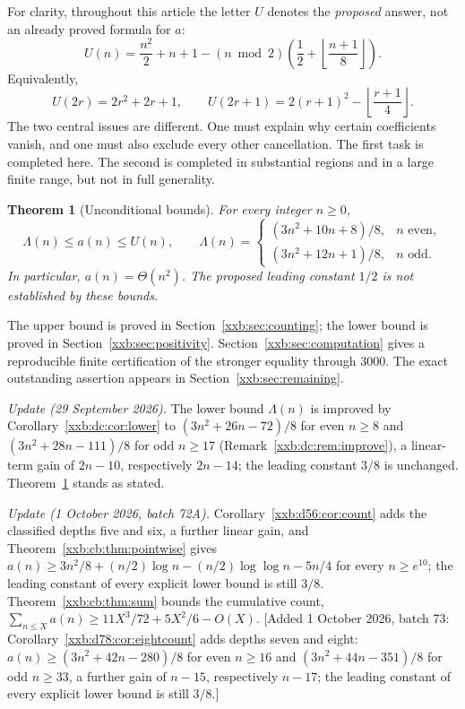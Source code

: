 \documentclass[11pt,a4paper]{article}
\numberwithin{equation}{section}
\newtheorem{theorem}{Theorem}[section]
\theoremstyle{definition}
\theoremstyle{remark}
\theoremstyle{plain}
\newcommand{\U}{U}
\begin{document}
For clarity, throughout this article the letter $\U$ denotes the
\emph{proposed} answer, not an already proved formula for $a$:
\begin{equation}\label{xxb:eq:U}
 \U(n)=\frac{n^2}{2}+n+1
 -(n\bmod2)\left(\frac12+\left\lfloor\frac{n+1}{8}\right\rfloor\right).
\end{equation}
Equivalently,
\begin{equation}\label{xxb:eq:U-parity}
 \U(2r)=2r^2+2r+1,\qquad
 \U(2r+1)=2(r+1)^2-\left\lfloor\frac{r+1}{4}\right\rfloor.
\end{equation}
The two central issues are different. One must explain why certain
coefficients vanish, and one must also exclude every other cancellation.
The first task is completed here. The second is completed in substantial
regions and in a large finite range, but not in full generality.

\begin{theorem}[Unconditional bounds]\label{xxb:thm:main-bounds}
For every integer $n\ge0$,
\begin{equation}\label{xxb:eq:bounds}
 \Lambda(n)\le a(n)\le\U(n),
 \qquad
 \Lambda(n)=
 \begin{cases}
 (3n^2+10n+8)/8,&n\text{ even},\\[2pt]
 (3n^2+12n+1)/8,&n\text{ odd}.
 \end{cases}
\end{equation}
In particular, $a(n)=\Theta(n^2)$. The proposed leading constant $1/2$ is
not established by these bounds.
\end{theorem}

The upper bound is proved in Section~\ref{xxb:sec:counting}; the lower bound is
proved in Section~\ref{xxb:sec:positivity}. Section~\ref{xxb:sec:computation} gives a
reproducible finite certification of the stronger equality through $3000$.
The exact outstanding assertion appears in Section~\ref{xxb:sec:remaining}.

\emph{Update (29 September 2026).}  The lower bound $\Lambda(n)$ is improved by
Corollary~\ref{xxb:dc:cor:lower} to $(3n^2+26n-72)/8$ for even $n\ge8$ and
$(3n^2+28n-111)/8$ for odd $n\ge17$ (Remark~\ref{xxb:dc:rem:improve}), a
linear-term gain of $2n-10$, respectively $2n-14$; the leading constant $3/8$
is unchanged.  Theorem~\ref{xxb:thm:main-bounds} stands as stated.

\emph{Update (1 October 2026, batch 72A).}  Corollary~\ref{xxb:d56:cor:count}
adds the classified depths five and six, a further linear gain, and
Theorem~\ref{xxb:cb:thm:pointwise} gives
$a(n)\ge3n^2/8+(n/2)\log n-(n/2)\log\log n-5n/4$ for every $n\ge e^{10}$; the
leading constant of every explicit lower bound is still $3/8$.
Theorem~\ref{xxb:cb:thm:sum} bounds the cumulative count,
$\sum_{n\le X}a(n)\ge11X^3/72+5X^2/6-O(X)$.
[Added 1 October 2026, batch 73: Corollary~\ref{xxb:d78:cor:eightcount} adds depths seven and
eight: $a(n)\ge(3n^2+42n-280)/8$ for even $n\ge16$ and $(3n^2+44n-351)/8$ for
odd $n\ge33$, a further gain of $n-15$, respectively $n-17$; the leading
constant of every explicit lower bound is still $3/8$.]
\end{document}
